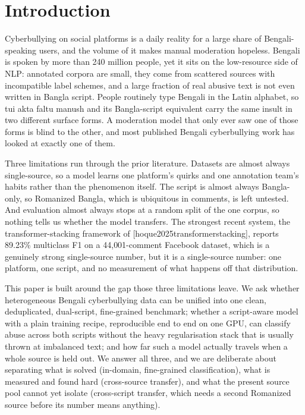 \documentclass[11pt,a4paper]{article}
\def\citet#1{[#1]}%
\def\emph#1{#1}%
\begin{document}
\section{Introduction}
\label{sec:introduction}

Cyberbullying on social platforms is a daily reality for a large share of Bengali-speaking users, and the volume of it makes manual moderation hopeless. Bengali is spoken by more than 240 million people, yet it sits on the low-resource side of NLP: annotated corpora are small, they come from scattered sources with incompatible label schemes, and a large fraction of real abusive text is not even written in Bangla script. People routinely type Bengali in the Latin alphabet, so \emph{tui akta faltu manush} and its Bangla-script equivalent carry the same insult in two different surface forms. A moderation model that only ever saw one of those forms is blind to the other, and most published Bengali cyberbullying work has looked at exactly one of them.

Three limitations run through the prior literature. Datasets are almost always single-source, so a model learns one platform's quirks and one annotation team's habits rather than the phenomenon itself. The script is almost always Bangla-only, so Romanized Bangla, which is ubiquitous in comments, is left untested. And evaluation almost always stops at a random split of the one corpus, so nothing tells us whether the model transfers. The strongest recent system, the transformer-stacking framework of \citet{hoque2025transformerstacking}, reports 89.23\% multiclass F1 on a 44{,}001-comment Facebook dataset, which is a genuinely strong single-source number, but it is a single-source number: one platform, one script, and no measurement of what happens off that distribution.

This paper is built around the gap those three limitations leave. We ask whether heterogeneous Bengali cyberbullying data can be unified into one clean, deduplicated, dual-script, fine-grained benchmark; whether a script-aware model with a plain training recipe, reproducible end to end on one GPU, can classify abuse across both scripts without the heavy regularisation stack that is usually thrown at imbalanced text; and how far such a model actually travels when a whole source is held out. We answer all three, and we are deliberate about separating what is solved (in-domain, fine-grained classification), what is measured and found hard (cross-source transfer), and what the present source pool cannot yet isolate (cross-script transfer, which needs a second Romanized source before its number means anything).
\end{document}
